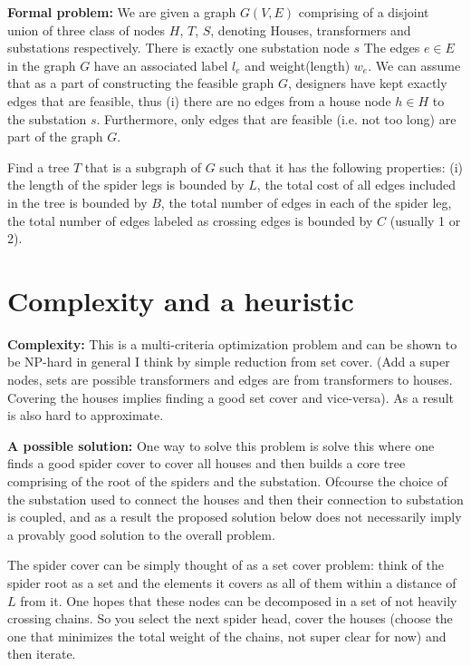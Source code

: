 \documentclass[11pt,letterpaper]{article}
\begin{document}
\noindent
\textbf{Formal problem:}  We are given a graph $G(V,E)$ 
comprising of a disjoint union of three class of nodes $H$, $T$, $S$, denoting Houses, transformers and substations respectively.
There is exactly one substation node $s$
The edges  $e \in E$ in the graph $G$ have an associated label $l_e$ and weight(length) $w_e$. We can assume that as a part of
constructing the feasible graph $G$, designers have kept exactly edges that are feasible, thus (i) there are no edges from  a house node
$h \in H$ to the substation $s$. Furthermore, only edges that are feasible (i.e. not too long) are part of the graph $G$.


Find a tree $T$ that is a subgraph of $G$ such that it has the following properties: (i) the length of the
spider legs is bounded by $L$, the total cost of all edges included in the tree is bounded by $B$, the total number of edges
in each of the spider leg, the total number of edges labeled as crossing edges is bounded by $C$ (usually 1 or 2).

\section{Complexity and a heuristic}

\noindent
\textbf{Complexity:}
This is a multi-criteria optimization problem and can be shown to be NP-hard in general I think by simple reduction from set cover.
(Add a super nodes, sets are possible transformers and edges are from transformers to houses. Covering the houses implies finding a good set cover and vice-versa). As a result is also hard to approximate.


\noindent
\textbf{A possible solution:}  One way to solve this problem is solve this where one finds a good spider cover to cover all houses and then
builds a core tree comprising of the root of the spiders and the substation. Ofcourse the choice of the substation used to connect the houses and then their connection to substation is coupled, and as a result the proposed solution below does not necessarily imply a provably good solution to the overall problem.

The spider cover can be simply thought of as a set cover problem: think of the spider root as a set and the elements it covers as all of them within a
distance of $L$ from it. One hopes that these nodes can be decomposed in a set of not heavily crossing chains. So you select the next spider head, cover the houses (choose the one that minimizes the total weight of the chains, not super clear for now) and then iterate.
\end{document}
